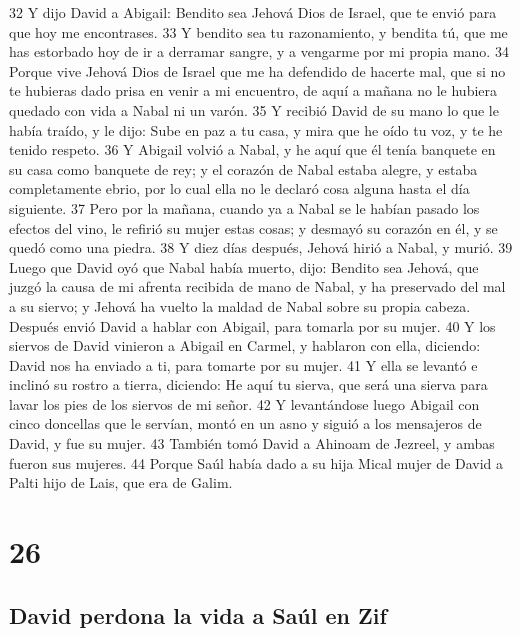 32 Y dijo David a Abigail: Bendito sea Jehová Dios de Israel, que te envió para que hoy me encontrases.
33 Y bendito sea tu razonamiento, y bendita tú, que me has estorbado hoy de ir a derramar sangre, y a vengarme por mi propia mano. 
34 Porque vive Jehová Dios de Israel que me ha defendido de hacerte mal, que si no te hubieras dado prisa en venir a mi encuentro, de aquí a mañana no le hubiera quedado con vida a Nabal ni un varón.
35 Y recibió David de su mano lo que le había traído, y le dijo: Sube en paz a tu casa, y mira que he oído tu voz, y te he tenido respeto.
36 Y Abigail volvió a Nabal, y he aquí que él tenía banquete en su casa como banquete de rey; y el corazón de Nabal estaba alegre, y estaba completamente ebrio, por lo cual ella no le declaró cosa alguna hasta el día siguiente.
37 Pero por la mañana, cuando ya a Nabal se le habían pasado los efectos del vino, le refirió su mujer estas cosas; y desmayó su corazón en él, y se quedó como una piedra.
38 Y diez días después, Jehová hirió a Nabal, y murió.
39 Luego que David oyó que Nabal había muerto, dijo: Bendito sea Jehová, que juzgó la causa de mi afrenta recibida de mano de Nabal, y ha preservado del mal a su siervo; y Jehová ha vuelto la maldad de Nabal sobre su propia cabeza. Después envió David a hablar con Abigail, para tomarla por su mujer.
40 Y los siervos de David vinieron a Abigail en Carmel, y hablaron con ella, diciendo: David nos ha enviado a ti, para tomarte por su mujer.
41 Y ella se levantó e inclinó su rostro a tierra, diciendo: He aquí tu sierva, que será una sierva para lavar los pies de los siervos de mi señor.
42 Y levantándose luego Abigail con cinco doncellas que le servían, montó en un asno y siguió a los mensajeros de David, y fue su mujer.
43 También tomó David a Ahinoam de Jezreel, y ambas fueron sus mujeres.
44 Porque Saúl había dado a su hija Mical mujer de David a Palti hijo de Lais, que era de Galim.

\chapter{26}

\section*{David perdona la vida a Saúl en Zif}


